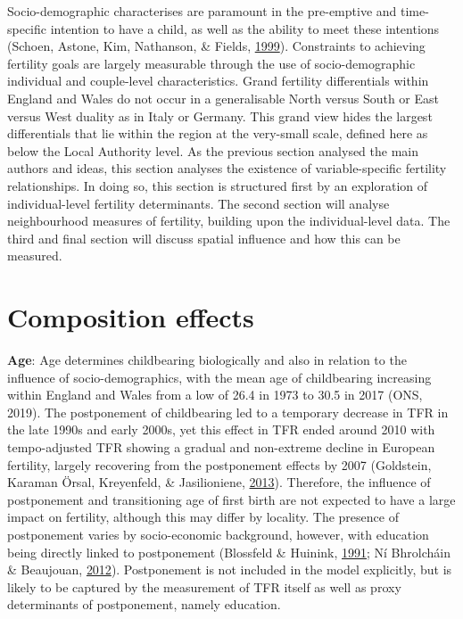 \documentclass[12pt,twoside]{reedthesis}
\begin{document}
Socio-demographic characterises are paramount in the pre-emptive and time-specific intention to have a child, as well as the ability to meet these intentions (Schoen, Astone, Kim, Nathanson, \& Fields, \protect\hyperlink{ref-schoen1999b}{1999}). Constraints to achieving fertility goals are largely measurable through the use of socio-demographic individual and couple-level characteristics. Grand fertility differentials within England and Wales do not occur in a generalisable North versus South or East versus West duality as in Italy or Germany. This grand view hides the largest differentials that lie within the region at the very-small scale, defined here as below the Local Authority level. As the previous section analysed the main authors and ideas, this section analyses the existence of variable-specific fertility relationships. In doing so, this section is structured first by an exploration of individual-level fertility determinants. The second section will analyse neighbourhood measures of fertility, building upon the individual-level data. The third and final section will discuss spatial influence and how this can be measured.

\hypertarget{composition-effects}{%
\section{Composition effects}\label{composition-effects}}

\textbf{Age}: Age determines childbearing biologically and also in relation to the influence of socio-demographics, with the mean age of childbearing increasing within England and Wales from a low of 26.4 in 1973 to 30.5 in 2017 (ONS, 2019). The postponement of childbearing led to a temporary decrease in TFR in the late 1990s and early 2000s, yet this effect in TFR ended around 2010 with tempo-adjusted TFR showing a gradual and non-extreme decline in European fertility, largely recovering from the postponement effects by 2007 (Goldstein, Karaman Örsal, Kreyenfeld, \& Jasilioniene, \protect\hyperlink{ref-goldstein2013}{2013}). Therefore, the influence of postponement and transitioning age of first birth are not expected to have a large impact on fertility, although this may differ by locality. The presence of postponement varies by socio-economic background, however, with education being directly linked to postponement (Blossfeld \& Huinink, \protect\hyperlink{ref-blossfeld1991}{1991}; Ní Bhrolcháin \& Beaujouan, \protect\hyperlink{ref-nibhrolchain2012}{2012}). Postponement is not included in the model explicitly, but is likely to be captured by the measurement of TFR itself as well as proxy determinants of postponement, namely education.
\end{document}
